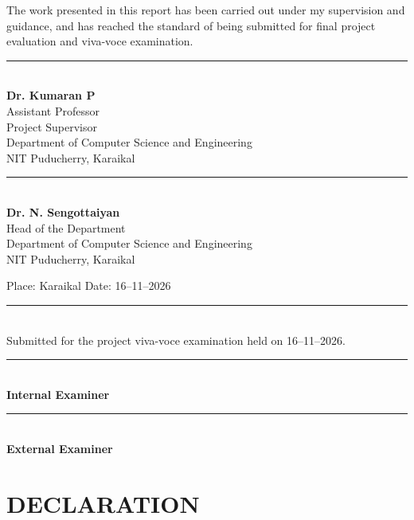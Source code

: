 \documentclass[12pt,a4paper,oneside]{report}
\newcommand{\studentBranch}{Computer Science and Engineering}
\newcommand{\internalGuide}{Dr. Kumaran P}
\newcommand{\internalGuideDesig}{Assistant Professor}
\newcommand{\hodName}{Dr. N. Sengottaiyan}
\begin{document}
\vspace{5mm}
The work presented in this report has been carried out under my supervision and guidance, and has reached the standard of being submitted for final project evaluation and viva-voce examination.

\vspace{12mm}
\singlespacing\small\noindent
\begin{minipage}[t]{0.46\textwidth}\raggedright
\rule{55mm}{0.4pt}\\ \textbf{\internalGuide}\\ \internalGuideDesig\\
Project Supervisor\\ Department of \studentBranch\\ NIT Puducherry, Karaikal
\end{minipage}\hfill
\begin{minipage}[t]{0.46\textwidth}\raggedright
\rule{55mm}{0.4pt}\\ \textbf{\hodName}\\ Head of the Department\\
Department of \studentBranch\\ NIT Puducherry, Karaikal
\end{minipage}

\vspace{10mm}
\noindent Place: Karaikal \hfill Date: 16--11--2026

\vspace{8mm}
\begin{center}\rule{0.75\textwidth}{0.4pt}\\[3mm]
Submitted for the project viva-voce examination held on 16--11--2026.
\end{center}

\vspace{12mm}\noindent
\begin{minipage}[t]{0.46\textwidth}\raggedright
\rule{55mm}{0.4pt}\\ \textbf{Internal Examiner}\end{minipage}\hfill
\begin{minipage}[t]{0.46\textwidth}\raggedright
\rule{55mm}{0.4pt}\\ \textbf{External Examiner}\end{minipage}
\normalsize\onehalfspacing
\clearpage

\chapter*{\centering DECLARATION}
\vspace{8mm}
\end{document}
